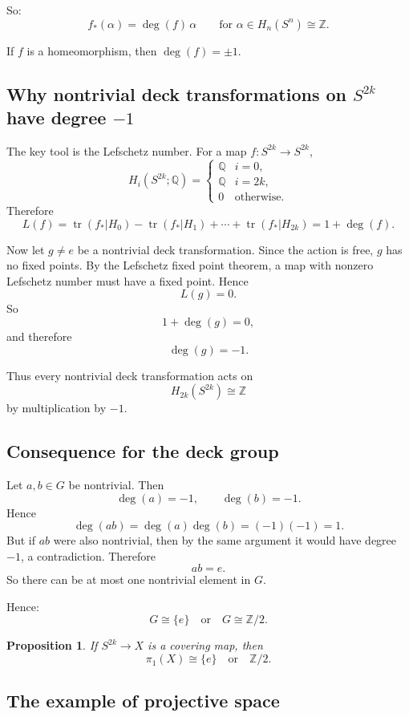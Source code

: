 \documentclass[12pt,a4paper]{article}
\newcommand{\Z}{\mathbb{Z}}
\newcommand{\Q}{\mathbb{Q}}
\newtheorem{proposition}{Proposition}
\theoremstyle{notespace}
\begin{document}
	So:
	\[
	f_*(\alpha)=\deg(f)\,\alpha
	\qquad \text{for }\alpha\in H_n(S^n)\cong \Z.
	\]
	
	If $f$ is a homeomorphism, then $\deg(f)=\pm 1$.
	
	\subsection{Why nontrivial deck transformations on $S^{2k}$ have degree $-1$}
	
	The key tool is the Lefschetz number. For a map $f:S^{2k}\to S^{2k}$,
	\[
	H_i(S^{2k};\Q)=
	\begin{cases}
		\Q & i=0,\\
		\Q & i=2k,\\
		0 & \text{otherwise}.
	\end{cases}
	\]
	Therefore
	\[
	L(f)=\operatorname{tr}(f_*|H_0)-\operatorname{tr}(f_*|H_1)+\cdots+\operatorname{tr}(f_*|H_{2k})
	=1+\deg(f).
	\]
	
	Now let $g\neq e$ be a nontrivial deck transformation. Since the action is free, $g$ has no fixed points. By the Lefschetz fixed point theorem, a map with nonzero Lefschetz number must have a fixed point. Hence
	\[
	L(g)=0.
	\]
	So
	\[
	1+\deg(g)=0,
	\]
	and therefore
	\[
	\deg(g)=-1.
	\]
	
	Thus every nontrivial deck transformation acts on
	\[
	H_{2k}(S^{2k})\cong \Z
	\]
	by multiplication by $-1$.
	
	\subsection{Consequence for the deck group}
	
	Let $a,b\in G$ be nontrivial. Then
	\[
	\deg(a)=-1,\qquad \deg(b)=-1.
	\]
	Hence
	\[
	\deg(ab)=\deg(a)\deg(b)=(-1)(-1)=1.
	\]
	But if $ab$ were also nontrivial, then by the same argument it would have degree $-1$, a contradiction. Therefore
	\[
	ab=e.
	\]
	So there can be at most one nontrivial element in $G$.
	
	Hence:
	\[
	G\cong \{e\}\quad\text{or}\quad G\cong \Z/2.
	\]
	
	\begin{proposition}
		If $S^{2k}\to X$ is a covering map, then
		\[
		\pi_1(X)\cong \{e\}\quad\text{or}\quad \Z/2.
		\]
	\end{proposition}
	
	\subsection{The example of projective space}
	
\end{document}
